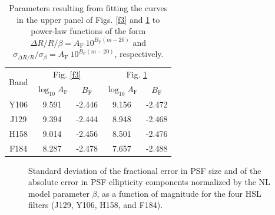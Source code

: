 \documentclass[11pt,preprint,flushrt]{aastex}
\begin{document}
\begin{table}
\centering
\begin{tabular}{|c|c|c|c|c|}
\hline
\multirow{2}{*}{Band} & \multicolumn{2}{c|}{Fig. \ref{f3}} & \multicolumn{2}{c|}{Fig. \ref{f5}} \\
\cline{2-5}
& $\log_{10} A_{\text{F}}$ & $B_{\text{F}}$ & $\log_{10} A_{\text{F}}$ & $B_{\text{F}}$  \\
\hline
Y106 & 9.591 & -2.446 & 9.156  & -2.472  \\
\hline
J129 & 9.394 & -2.444 & 8.948 & -2.468  \\
\hline
H158 & 9.014 & -2.456 & 8.501 & -2.476 \\
\hline
F184 & 8.287 & -2.478 & 7.657 & -2.488 \\
\hline
\end{tabular}
\caption{Parameters resulting from fitting the curves in the upper panel of Figs. \ref{f3} and \ref{f5} to power-law functions of the form $\Delta R/ R/ \beta = A_{\text{F}}\ 10^{B_{\text{F}} (m - 20)}$ and $\sigma_{\Delta R/ R}/ \sigma_{\beta} = A_{\text{F}}\ 10^{B_{\text{F}} (m - 20)}$, respectively.}
\label{table2}
\end{table}

\begin{figure}[!h]
\centering
{}
\caption{Standard deviation of the fractional error in PSF size and of the absolute error in PSF ellipticity components normalized by the NL model parameter $\beta$, as a function of magnitude for the four HSL filters (J129, Y106, H158, and F184).}
\label{f5}
\end{figure}
\end{document}
